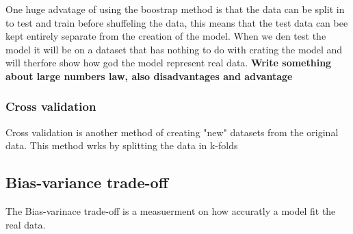 One huge advatage of using the boostrap method is that the data can be split in to 
test and train before shuffeling the data, this means that the test data can bee kept 
entirely separate from the creation of the model. When we den test the model it will
be on a dataset that has nothing to do with crating the model and will therfore show
how god the model represent real data. 
\textbf{Write something about large numbers law, also disadvantages and advantage}


\subsubsection{Cross validation}
\noindent Cross validation is another method of creating "new" datasets from the original data. This method 
wrks by splitting the data in k-folds



\subsection{Bias-variance trade-off}
The Bias-varinace trade-off is a measuerment on how accuratly a model fit the real data.

